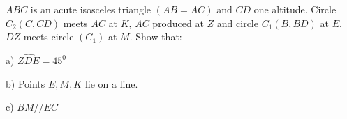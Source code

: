 $ABC$ is an acute isosceles triangle $(AB=AC)$ and $CD$ one altitude. Circle $C_2(C,CD)$ meets $AC$ at $K$,  $AC$ produced at $Z$ and circle $C_1(B, BD)$ at $E$. $DZ$ meets circle $(C_1)$ at $M$. Show that:

a) $\widehat{ZDE}=45^0$

b) Points $E, M, K$ lie on a line.

c) $BM//EC$
